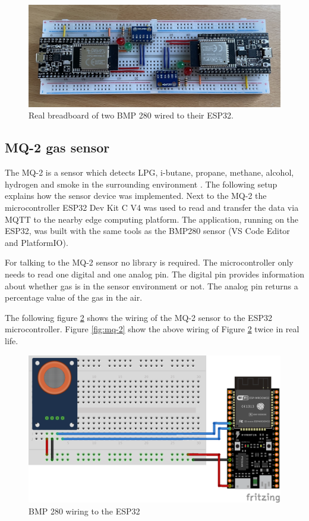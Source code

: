 \begin{figure}[H]
    \centering
    \includegraphics[width=\textwidth]{assets/setup/bmp280.jpeg}
    \caption{Real breadboard of two BMP 280 wired to their ESP32.}\label{fig:bmp280}
\end{figure}


\subsection{MQ-2 gas sensor}\label{subsec:mq2}
The MQ-2 is a sensor which detects LPG, i-butane, propane, methane, alcohol, hydrogen and smoke in the surrounding environment \cite{Az-delivery-MQ-2}. The following setup explains how the sensor device was implemented. Next to the MQ-2 the microcontroller ESP32 Dev Kit C V4 was used to read and transfer the data via MQTT to the nearby edge computing platform. The application, running on the ESP32, was built with the same tools as the BMP280 sensor (VS Code Editor and PlatformIO).

\bigskip
For talking to the MQ-2 sensor no library is required. The microcontroller only needs to read one digital and one analog pin. The digital pin provides information about whether gas is in the sensor environment or not. The analog pin returns a percentage value of the gas in the air.

\bigskip
The following figure \ref{fig:wiring-mq-2} shows the wiring of the MQ-2 sensor to the ESP32 microcontroller. Figure \ref{fig:mq-2} show the above wiring of Figure \ref{fig:wiring-mq-2} twice in real life.

\begin{figure}[H]
    \centering
    \includegraphics[width=\textwidth]{assets/setup/wiring-mq-2.png}
    \caption{BMP 280 wiring to the ESP32}\label{fig:wiring-mq-2}
\end{figure}

